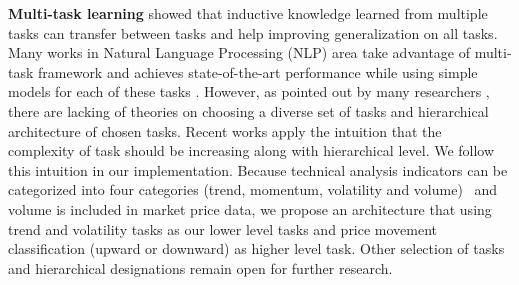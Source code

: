 \documentclass[sigconf]{acmart}
\renewcommand{\citename}{\citet}
\renewcommand{\cite}{\citep}
\begin{document}
\textbf{Multi-task learning} \citename{caruana1993multitask}
showed that inductive knowledge learned from multiple tasks can
transfer between tasks and help improving generalization on all
tasks. Many works in Natural Language Processing (NLP) area take
advantage of multi-task framework and achieves state-of-the-art
performance while using simple models for each of these tasks
\cite{sogaard2016deep,hashimoto2016joint}. However, as pointed
out by many researchers
\cite{caruana1993multitask,ruder2017overview}, there are lacking
of theories on choosing a diverse set of tasks and hierarchical
architecture of chosen tasks. Recent works
\cite{sogaard2016deep,hashimoto2016joint} apply the intuition
that the complexity of task should be increasing along with
hierarchical level. We follow this intuition in our
implementation. Because technical analysis indicators can be
categorized into four categories (trend, momentum, volatility and
volume)~\cite{kirkpatrick2010technical} and volume is included in
market price data, we propose an architecture that using trend
and volatility tasks as our lower level tasks and price movement
classification (upward or downward) as higher level task. Other
selection of tasks and hierarchical designations remain open for
further research.


\end{document}
